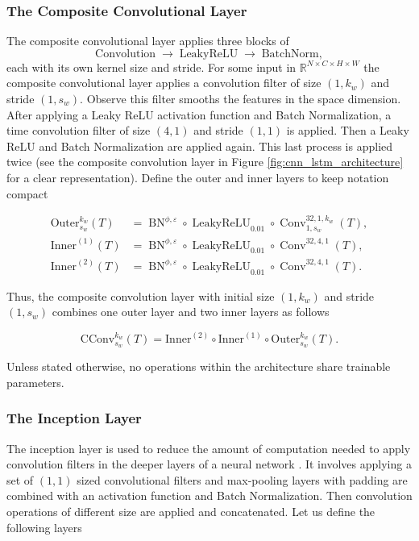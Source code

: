 \documentclass[10pt,a4paper,oneside]{article}
\newcommand{\R}{\mathbb{R}}
\DeclareMathOperator{\LeakyReLU}{LeakyReLU}
\DeclareMathOperator{\batchnorm}{BN}
\DeclareMathOperator{\convolution}{Conv}
\begin{document}
\subsubsection{The Composite Convolutional Layer}
\label{subsubsec:comp_conv}

The composite convolutional layer applies three blocks of
\[
  \text{Convolution} \;\to\;\text{LeakyReLU} \;\to\;\text{BatchNorm},
\]
each with its own kernel size and stride. For some input in $\R^{N \times C \times H \times W}$ the composite convolutional layer applies a convolution filter of size $(1, k_w)$ and stride $(1, s_w)$. Observe this filter smooths the features in the space dimension. After applying a Leaky ReLU activation function and Batch Normalization, a time convolution filter of size $(4, 1)$ and stride $(1, 1)$ is applied. Then a Leaky ReLU and Batch Normalization are applied again. This last process is applied twice (see the composite convolution layer in Figure \ref{fig:cnn_lstm_architecture} for a clear representation). Define the outer and inner layers to keep notation compact

\begin{align*}
    \mathrm{Outer}^{k_w}_{s_w}(T) &= \batchnorm^{\phi, \varepsilon} \circ \LeakyReLU_{0.01} \circ \convolution^{32, 1, k_w}_{1, s_w}(T),\\
    \mathrm{Inner}^{(1)}(T) &= \batchnorm^{\phi,\varepsilon}\circ\LeakyReLU_{0.01}\circ\convolution^{32,4,1}(T),\\
\mathrm{Inner}^{(2)}(T) &= \batchnorm^{\phi,\varepsilon}\circ\LeakyReLU_{0.01}\circ\convolution^{32,4,1}(T).
\end{align*}



Thus, the composite convolution layer with initial size $(1, k_w)$ and stride $(1, s_w)$ combines one outer layer and two inner layers as follows 

$$
\mathrm{CConv}^{k_w}_{s_w}(T) = \mathrm{Inner}^{(2)} \circ \mathrm{Inner}^{(1)} \circ \mathrm{Outer}^{k_w}_{s_w} (T).
$$

Unless stated otherwise, no operations within the architecture share trainable parameters.

\subsubsection{The Inception Layer}

The inception layer is used to reduce the amount of computation needed to apply convolution filters in the deeper layers of a neural network \cite{szegedy2015going}. It involves applying a set of $(1, 1)$ sized convolutional filters and max-pooling layers with padding are combined with an activation function and Batch Normalization. Then convolution operations of different size are applied and concatenated. Let us define the following layers
\end{document}
